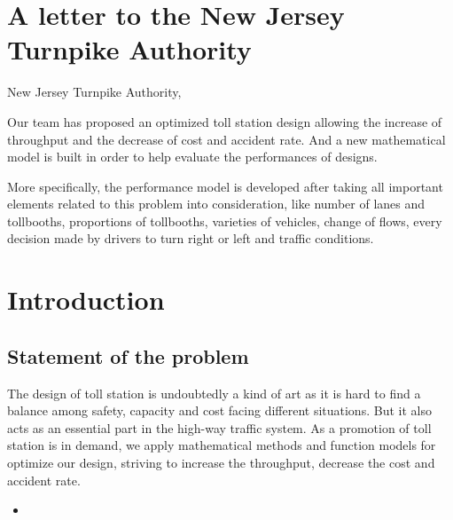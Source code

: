 \documentclass{mcmthesis}
\begin{document}
\section{A letter to the New Jersey Turnpike Authority}


New Jersey Turnpike Authority,

Our team has proposed an optimized toll station design allowing the increase of throughput and the decrease of cost and accident rate. And a new mathematical model is built in order to help evaluate the performances of designs. 

More specifically, the performance model is developed after taking all important elements related to this problem into consideration, like number of lanes and tollbooths, proportions of tollbooths, varieties of vehicles, change of flows, every decision made by drivers to turn right or left and traffic conditions. 



\section{Introduction}

\subsection{Statement of the problem}


  The design of toll station is undoubtedly a kind of art as it is hard to find a balance among safety, capacity and cost facing different situations. But it also acts as an essential part in the high-way traffic system. As a promotion of toll station is in demand, we apply mathematical methods and function models for optimize our design, striving to increase the throughput, decrease the cost and accident rate.



\begin{itemize}

\item 
\end{itemize}







\begin{Theorem} \label{thm:latex}

\end{Theorem}

\begin{Lemma} \label{thm:tex}

\end{Lemma}
\end{document}
